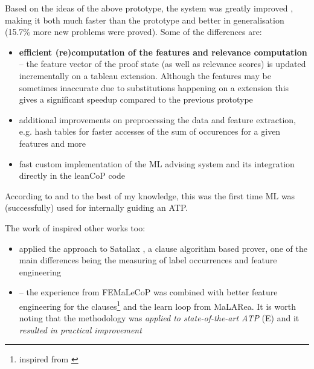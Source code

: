 \documentclass{article}
\begin{document}
Based on the ideas of the above prototype, the system was greatly improved
\citep{femalecop}, making it both much faster than the prototype and better in
generalisation (15.7\% more new problems were proved). Some of the differences
are:
\begin{itemize}
    \item \textbf{efficient (re)computation of the features and relevance
        computation} -- the feature vector of the proof state (as well as
        relevance scores) is updated incrementally on a tableau extension.
        Although the features may be sometimes inaccurate due to substitutions
        happening on a extension this gives a significant speedup compared to
        the previous prototype
    \item additional improvements on preprocessing the data and feature
        extraction, e.g. hash tables for faster accesses of the sum of
        occurences for a given features and more
    \item fast custom implementation of the ML advising system and its
        integration directly in the leanCoP code
\end{itemize}
According to \cite{femalecop} and to the best of my knowledge, this was
the first time ML was (successfully) used for internally guiding an ATP.

The work of \cite{femalecop} inspired other works too:
\begin{itemize}
    \item \cite{Satallax} applied the approach to Satallax
        \citep{SatallaxProver}, a clause algorithm based prover, one of the
        main differences being the measuring of label occurrences and feature
        engineering
    \item \cite{Enigma} -- the experience from FEMaLeCoP was combined with
        better feature engineering for the clauses\footnote{inspired from
        \cite{EFSF}} and the learn loop from MaLARea. It is worth noting that
        the methodology was \emph{applied to state-of-the-art ATP} (E) and
        it \emph{resulted in practical improvement}
\end{itemize}
\end{document}
